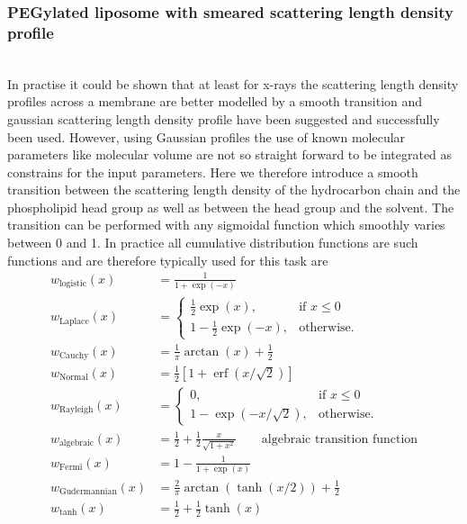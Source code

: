 \subsubsection{PEGylated liposome with smeared scattering length density profile} ~\\
\label{sec:PEGylatedVesicle}
In practise it could be shown \cite{Pabst2002,Brzustowicz2005} that at least for x-rays the scattering length density profiles across a membrane are better modelled by a smooth transition and gaussian scattering length density profile have been suggested and successfully been used. However, using Gaussian profiles the use of known molecular parameters like molecular volume are not so straight forward to be integrated as constrains for the input parameters.
Here we therefore introduce a smooth transition between the scattering length density of the hydrocarbon chain and the phospholipid head group as well as between the head group and the solvent. The transition can be performed with any sigmoidal function which smoothly varies between 0 and 1. In practice all cumulative distribution functions are such functions and are therefore typically used for this task are
\begin{subequations}
\begin{align}
  w_\mathrm{logistic}(x) &=\frac{1}{1+\exp(-x)} \\
  w_\mathrm{Laplace}(x) &= \begin{cases}
                             \frac12 \exp(x), & \mbox{if } x\leq 0 \\
                             1-\frac12 \exp(-x), & \mbox{otherwise}.
                           \end{cases}  \\
  w_\mathrm{Cauchy}(x) &= \frac{1}{\pi}\arctan(x)+\frac12  \\
  w_\mathrm{Normal}(x) &=\frac12 \left[1+\operatorname{erf}(x/\sqrt{2})\right]  \\
  w_\mathrm{Rayleigh}(x) &= \begin{cases}
                             0, & \mbox{if } x\leq 0 \\
                             1-\exp\left(-x/\sqrt{2}\right), & \mbox{otherwise}.
                           \end{cases} \\
  w_\mathrm{algebraic}(x) &=\frac12 + \frac12 \frac{x}{\sqrt{1+x^2}} \qquad\mbox{algebraic transition function}\\
  w_\mathrm{Fermi}(x) &=1-\frac{1}{1+\exp(x)} \\
  w_\mathrm{Gudermannian}(x) &=\frac{2}{\pi}\arctan\left(\tanh(x/2)\right)+\frac12\\
  w_\mathrm{tanh}(x) &=\frac12 + \frac12 \tanh(x)
\end{align}
\end{subequations}
